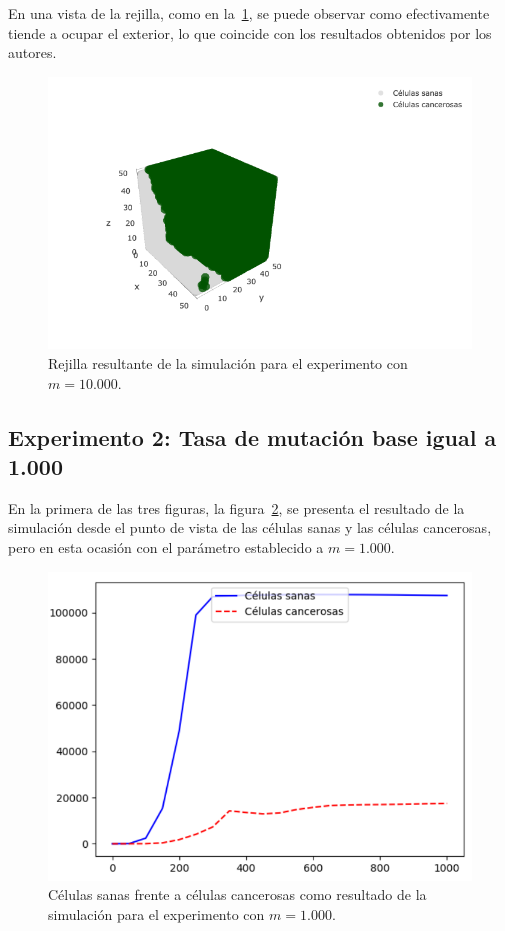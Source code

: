 En una vista de la rejilla, como en la~\ref{fig:ownexp1-3}, se puede observar como
efectivamente tiende a ocupar el exterior, lo que coincide con los resultados obtenidos por los
autores.

\begin{figure}[h]
\centering
\includegraphics[scale=0.6]{figures/experiments/exp1/grid}
\caption{Rejilla resultante de la simulación para el experimento con $m = 10.000$.}
\label{fig:ownexp1-3}
\end{figure}

\clearpage

\subsection{Experimento 2: Tasa de mutación base igual a 1.000}

En la primera de las tres figuras, la figura~\ref{fig:ownexp2-1}, se presenta el resultado
de la simulación desde el punto de vista de las células sanas y las células cancerosas,
pero en esta ocasión con el parámetro establecido a $m=1.000$.

\begin{figure}[h]
\centering
\includegraphics[scale=0.8]{figures/experiments/exp2/healthvscarcino}
\caption{Células sanas frente a células cancerosas como resultado de la simulación para el experimento con $m = 1.000$.}
\label{fig:ownexp2-1}
\end{figure}

